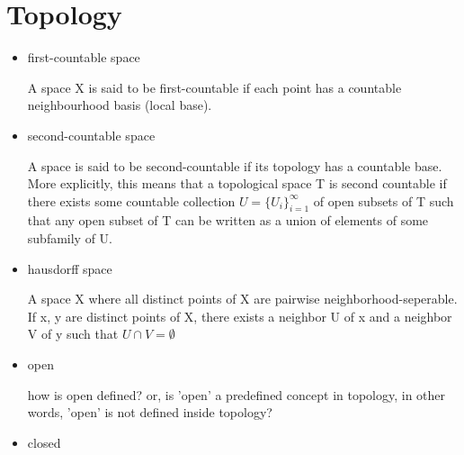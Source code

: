 \documentclass[10pt,a4paper]{book}
\begin{document}
\section{Topology}

\begin{itemize}
	\item first-countable space
	
	A space X is said to be first-countable if each point has a countable neighbourhood basis (local base).
	
	\item second-countable space
	
	A space is said to be second-countable if its topology has a countable base. More explicitly, this means that a topological space  T is second countable if there exists some countable collection $ U=\{U_{i}\}_{i=1}^{\infty }$ of open subsets of T such that any open subset of  T can be written as a union of elements of some subfamily of U.
	
	\item hausdorff space
	
	A space X where all distinct points of X are pairwise neighborhood-seperable. If x, y are distinct points of X, there exists a neighbor U of x and a neighbor V of y such that $U \cap V = \emptyset $
	
	\item open
	
	how is open defined? or, is 'open' a predefined concept in topology, in other words, 'open' is not defined inside topology?
	
	
	
	\item closed
	
	
\end{itemize}
\end{document}
